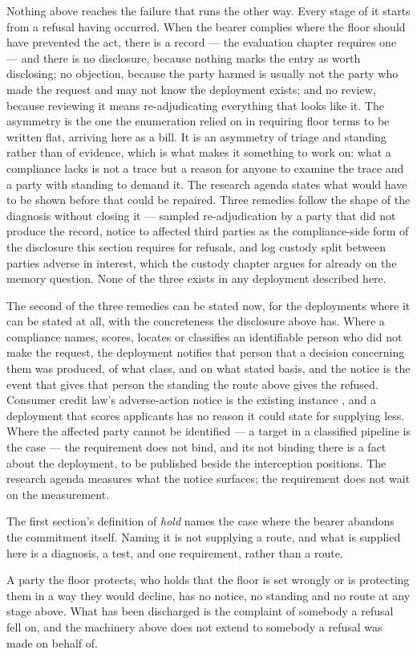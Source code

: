 
Nothing above reaches the failure that runs the other way. Every stage of it starts from a refusal having occurred. When the bearer complies where the floor should have prevented the act, there is a record — the evaluation chapter requires one — and there is no disclosure, because nothing marks the entry as worth disclosing; no objection, because the party harmed is usually not the party who made the request and may not know the deployment exists; and no review, because reviewing it means re-adjudicating everything that looks like it. The asymmetry is the one the enumeration relied on in requiring floor terms to be written flat, arriving here as a bill. It is an asymmetry of triage and standing rather than of evidence, which is what makes it something to work on: what a compliance lacks is not a trace but a reason for anyone to examine the trace and a party with standing to demand it. The research agenda states what would have to be shown before that could
be repaired. Three remedies follow the shape of the diagnosis without closing it — sampled re-adjudication by a party that did not produce the record, notice to affected third parties as the compliance-side form of the disclosure this section requires for refusals, and log custody split between parties adverse in interest, which the custody chapter argues for already on the memory question. None of the three exists in any deployment described here.

The second of the three remedies can be stated now, for the deployments where it can be stated at all, with the concreteness the disclosure above has. Where a compliance names, scores, locates or classifies an identifiable person who did not make the request, the deployment notifies that person that a decision concerning them was produced, of what class, and on what stated basis, and the notice is the event that gives that person the standing the route above gives the refused. Consumer credit law's adverse-action notice is the existing instance \autocite{usa1974ecoa}, and a deployment that scores applicants has no reason it could state for supplying less. Where the affected party cannot be identified — a target in a classified pipeline is the case — the requirement does not bind, and its not binding there is a fact about the deployment, to be published beside the interception positions. The research agenda measures what the notice surfaces; the requirement does not wait on the measurement.

The first section's definition of \emph{hold} names the case where the bearer abandons the commitment itself. Naming it is not supplying a route, and what is supplied here is a diagnosis, a test, and one requirement, rather than a route.

A party the floor protects, who holds that the floor is set wrongly or is protecting them in a way they would decline, has no notice, no standing and no route at any stage above. What has been discharged is the complaint of somebody a refusal fell on, and the machinery above does not extend to somebody a refusal was made on behalf of.
